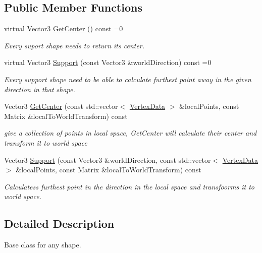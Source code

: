\subsection*{Public Member Functions}
\begin{DoxyCompactItemize}
\item 
virtual Vector3 \hyperlink{classSupportShape_ac81f62a38aeadbf03d637e5134479467}{Get\+Center} () const =0
\begin{DoxyCompactList}\small\item\em Every suport shape needs to return its center. \end{DoxyCompactList}\item 
virtual Vector3 \hyperlink{classSupportShape_ad6aca93d79a36c7db3a449a4364a2c1e}{Support} (const Vector3 \&world\+Direction) const =0
\begin{DoxyCompactList}\small\item\em Every support shape need to be able to calculate furthest point away in the given direction in that shape. \end{DoxyCompactList}\item 
Vector3 \hyperlink{classSupportShape_a2cda78c3f08e49269c830d6ab0595244}{Get\+Center} (const std\+::vector$<$ \hyperlink{structVertexData}{Vertex\+Data} $>$ \&local\+Points, const Matrix \&local\+To\+World\+Transform) const
\begin{DoxyCompactList}\small\item\em give a collection of points in local space, Get\+Center will calculate their center and transform it to world space \end{DoxyCompactList}\item 
Vector3 \hyperlink{classSupportShape_a105572c175fd14661261a7d189d409a2}{Support} (const Vector3 \&world\+Direction, const std\+::vector$<$ \hyperlink{structVertexData}{Vertex\+Data} $>$ \&local\+Points, const Matrix \&local\+To\+World\+Transform) const
\begin{DoxyCompactList}\small\item\em Calculatess furthest point in the direction in the local space and transfoorms it to world space. \end{DoxyCompactList}\end{DoxyCompactItemize}


\subsection{Detailed Description}
Base class for any shape. 

